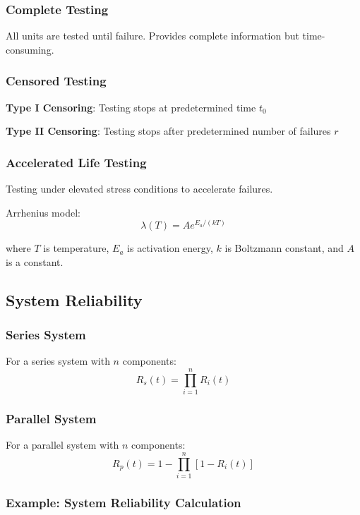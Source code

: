 \documentclass[twoside]{book}
\begin{document}
\subsubsection{Complete Testing}

All units are tested until failure. Provides complete information but time-consuming.

\subsubsection{Censored Testing}

\textbf{Type I Censoring}: Testing stops at predetermined time $t_0$

\textbf{Type II Censoring}: Testing stops after predetermined number of failures $r$

\subsubsection{Accelerated Life Testing}

Testing under elevated stress conditions to accelerate failures.

Arrhenius model:
$$\lambda(T) = A e^{E_a/(kT)}$$

where $T$ is temperature, $E_a$ is activation energy, $k$ is Boltzmann constant, and $A$ is a constant.

\subsection{System Reliability}

\subsubsection{Series System}

For a series system with $n$ components:
$$R_s(t) = \prod_{i=1}^{n} R_i(t)$$

\subsubsection{Parallel System}

For a parallel system with $n$ components:
$$R_p(t) = 1 - \prod_{i=1}^{n} [1 - R_i(t)]$$

\subsubsection{Example: System Reliability Calculation}
\end{document}
